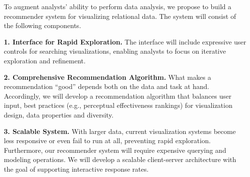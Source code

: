 To augment analysts’ ability to perform data analysis, we propose to build a recommender system for visualizing relational data. The system will consist of the following components.

\textbf{1. Interface for Rapid Exploration.}
The interface will include expressive user controls for searching visualizations, enabling analysts to focus on iterative exploration and refinement.

\textbf{2. Comprehensive Recommendation Algorithm.}  What makes a recommendation “good” depends both on the data and task at hand. Accordingly, we will develop a recommendation algorithm that balances user input, best practices (e.g., perceptual effectiveness rankings) for visualization design, data properties and diversity.

\textbf{3. Scalable System.} With larger data, current visualization systems become less responsive or even fail to run at all, preventing rapid exploration.  Furthermore, our recommender system will require expensive querying and modeling operations. We will develop a scalable client-server architecture with the goal of supporting interactive response rates.

